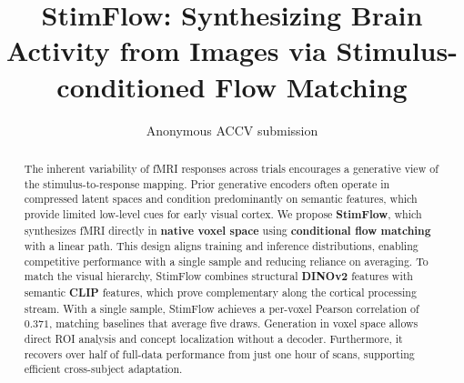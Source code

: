 \documentclass[runningheads]{llncs}
\begin{document}
\title{StimFlow: Synthesizing Brain Activity from Images via Stimulus-conditioned Flow Matching}


\author{Anonymous ACCV submission}



\maketitle


\begin{abstract}
  The inherent variability of fMRI responses across trials encourages a
  generative view of the stimulus-to-response mapping. Prior generative encoders
  often operate in compressed latent spaces and condition predominantly on
  semantic features, which provide limited low-level cues for early visual
  cortex. We propose \textbf{StimFlow}, which synthesizes fMRI directly in
  \textbf{native voxel space} using \textbf{conditional flow matching} with a
  linear path. This design aligns training and inference distributions, enabling
  competitive performance with a single sample and reducing reliance on
  averaging. To match the visual hierarchy, StimFlow combines structural
  \textbf{DINOv2} features with semantic \textbf{CLIP} features, which prove
  complementary along the cortical processing stream. With a single sample,
  StimFlow achieves a per-voxel Pearson correlation of $\mathbf{0.371}$,
  matching baselines that average five draws. Generation in voxel space allows
  direct ROI analysis and concept localization without a decoder. Furthermore,
  it recovers over half of full-data performance from just one hour of scans,
  supporting efficient cross-subject adaptation.
\end{abstract}
\end{document}
